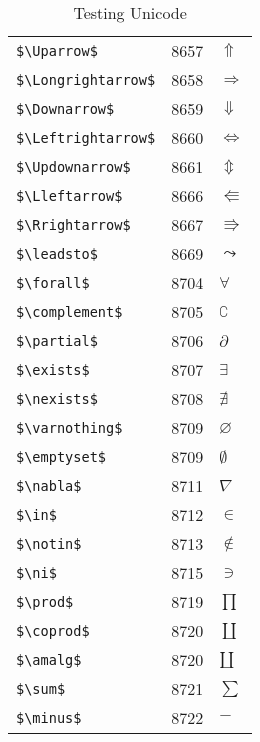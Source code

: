 \documentclass{article}
\begin{document}
\begin{table}
\begin{center}
\begin{tabular}{lll}
\verb#$\Uparrow$# & 8657 & $\Uparrow$\\ 
\verb#$\Longrightarrow$# & 8658 & $\Longrightarrow$\\ 
\verb#$\Downarrow$# & 8659 & $\Downarrow$\\ 
\verb#$\Leftrightarrow$# & 8660 & $\Leftrightarrow$\\ 
\verb#$\Updownarrow$# & 8661 & $\Updownarrow$\\ 
\verb#$\Lleftarrow$# & 8666 & $\Lleftarrow$\\ 
\verb#$\Rrightarrow$# & 8667 & $\Rrightarrow$\\ 
\verb#$\leadsto$# & 8669 & $\leadsto$\\ 
\verb#$\forall$# & 8704 & $\forall$\\ 
\verb#$\complement$# & 8705 & $\complement$\\ 
\verb#$\partial$# & 8706 & $\partial$\\ 
\verb#$\exists$# & 8707 & $\exists$\\ 
\verb#$\nexists$# & 8708 & $\nexists$\\ 
\verb#$\varnothing$# & 8709 & $\varnothing$\\ 
\verb#$\emptyset$# & 8709 & $\emptyset$\\ 
\verb#$\nabla$# & 8711 & $\nabla$\\ 
\verb#$\in$# & 8712 & $\in$\\ 
\verb#$\notin$# & 8713 & $\notin$\\ 
\verb#$\ni$# & 8715 & $\ni$\\ 
\verb#$\prod$# & 8719 & $\prod$\\ 
\verb#$\coprod$# & 8720 & $\coprod$\\ 
\verb#$\amalg$# & 8720 & $\amalg$\\ 
\verb#$\sum$# & 8721 & $\sum$\\ 
\verb#$\minus$# & 8722 & $\minus$\\ 
\end{tabular}
\end{center}
\caption{Testing Unicode}
\end{table}
\clearpage
\end{document}
